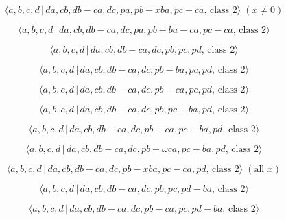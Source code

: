 \documentclass[10pt]{article}
\begin{document}
\begin{equation}
\langle a,b,c,d\,|\,da,cb,db-ca,dc,pa,pb-xba,pc-ca,\,\text{class }2\rangle
\;(x \neq 0)  \tag{7.3047}
\end{equation}

\begin{equation}
\langle a,b,c,d\,|\,da,cb,db-ca,dc,pa,pb-ba-ca,pc-ca,\,\text{class }2\rangle
\tag{7.3048}
\end{equation}

\begin{equation}
\langle a,b,c,d\,|\,da,cb,db-ca,dc,pb,pc,pd,\,\text{class }2\rangle 
\tag{7.3049}
\end{equation}

\begin{equation}
\langle a,b,c,d\,|\,da,cb,db-ca,dc,pb-ba,pc,pd,\,\text{class }2\rangle 
\tag{7.3050}
\end{equation}

\begin{equation}
\langle a,b,c,d\,|\,da,cb,db-ca,dc,pb-ca,pc,pd,\,\text{class }2\rangle 
\tag{7.3051}
\end{equation}

\begin{equation}
\langle a,b,c,d\,|\,da,cb,db-ca,dc,pb,pc-ba,pd,\,\text{class }2\rangle 
\tag{7.3052}
\end{equation}

\begin{equation}
\langle a,b,c,d\,|\,da,cb,db-ca,dc,pb-ca,pc-ba,pd,\,\text{class }2\rangle 
\tag{7.3053}
\end{equation}

\begin{equation}
\langle a,b,c,d\,|\,da,cb,db-ca,dc,pb-\omega ca,pc-ba,pd,\,\text{class }%
2\rangle  \tag{7.3054}
\end{equation}

\begin{equation}
\langle a,b,c,d\,|\,da,cb,db-ca,dc,pb-xba,pc-ca,pd,\,\text{class }2\rangle
\;(\text{all }x)  \tag{7.3055}
\end{equation}

\begin{equation}
\langle a,b,c,d\,|\,da,cb,db-ca,dc,pb,pc,pd-ba,\,\text{class }2\rangle 
\tag{7.3056}
\end{equation}

\begin{equation}
\langle a,b,c,d\,|\,da,cb,db-ca,dc,pb-ca,pc,pd-ba,\,\text{class }2\rangle 
\tag{7.3057}
\end{equation}
\end{document}
